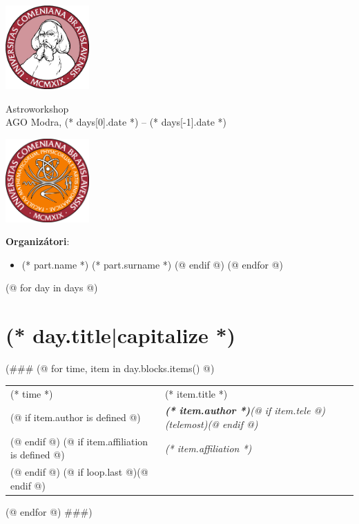 \documentclass[a4paper]{report}
\begin{document}
    \begin{minipage}{\textwidth}
        \begin{minipage}{0.2\textwidth}
            \includegraphics[width=32mm]{input/logo.jpg}
        \end{minipage}
        \begin{minipage}{0.58\textwidth}
            \centering
            \fontsize{40}{50}\selectfont
            Astroworkshop\\
            \Large
            AGO Modra, (* days[0].date *) -- (* days[-1].date *)
        \end{minipage}
        \begin{minipage}{0.2\textwidth}
            \includegraphics[width=32mm]{input/fmfi.png}
        \end{minipage}
    \end{minipage}
    \vspace*{10mm}

    \textbf{Organizátori}:
    \begin{itemize}[itemsep=-2mm]
    (@ for part in participants @)
        (@ if part.org @)
            \item (* part.name *) (* part.surname *)
        (@ endif @)
    (@ endfor @)
    \end{itemize}

    (@ for day in days @)
        \section{(* day.title|capitalize *)}
(###
        (@ for time, item in day.blocks.items() @)
            \begin{tabularx}{\textwidth}{>{}p{2cm} >{\RaggedRight}X}
                \midrule
                {\Large (* time *)} & {\Large (* item.title *)} \\
                    (@ if item.author is defined @)
                        & \textit{\textbf{(* item.author *)}(@ if item.tele @) (telemost)(@ endif @)} \\
                    (@ endif @)
                    (@ if item.affiliation is defined @)
                        & \textit{(* item.affiliation *)} \\
                    (@ endif @)
                    (@ if loop.last @)\midrule(@ endif @)
            \end{tabularx}
        (@ endfor @)
###)
\end{document}
